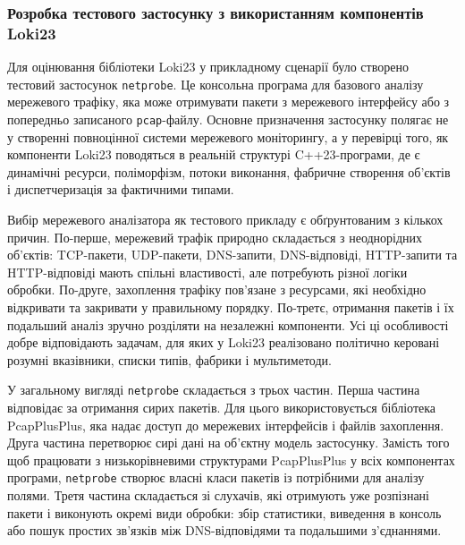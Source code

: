 \subsubsection{Розробка тестового застосунку з використанням компонентів
Loki23}\label{ux440ux43eux437ux440ux43eux431ux43aux430-ux442ux435ux441ux442ux43eux432ux43eux433ux43e-ux437ux430ux441ux442ux43eux441ux443ux43dux43aux443-ux437-ux432ux438ux43aux43eux440ux438ux441ux442ux430ux43dux43dux44fux43c-ux43aux43eux43cux43fux43eux43dux435ux43dux442ux456ux432-loki23}

Для оцінювання бібліотеки Loki23 у прикладному сценарії було створено
тестовий застосунок \texttt{netprobe}. Це консольна програма для
базового аналізу мережевого трафіку, яка може отримувати пакети з
мережевого інтерфейсу або з попередньо записаного \texttt{pcap}-файлу.
Основне призначення застосунку полягає не у створенні повноцінної
системи мережевого моніторингу, а у перевірці того, як компоненти Loki23
поводяться в реальній структурі C++23-програми, де є динамічні ресурси,
поліморфізм, потоки виконання, фабричне створення об'єктів і
диспетчеризація за фактичними типами.

Вибір мережевого аналізатора як тестового прикладу є обґрунтованим з
кількох причин. По-перше, мережевий трафік природно складається з
неоднорідних об'єктів: TCP-пакети, UDP-пакети, DNS-запити,
DNS-відповіді, HTTP-запити та HTTP-відповіді мають спільні властивості,
але потребують різної логіки обробки. По-друге, захоплення трафіку
пов'язане з ресурсами, які необхідно відкривати та закривати у
правильному порядку. По-третє, отримання пакетів і їх подальший аналіз
зручно розділяти на незалежні компоненти. Усі ці особливості добре
відповідають задачам, для яких у Loki23 реалізовано політично керовані
розумні вказівники, списки типів, фабрики і мультиметоди.

У загальному вигляді \texttt{netprobe} складається з трьох частин. Перша
частина відповідає за отримання сирих пакетів. Для цього
використовується бібліотека PcapPlusPlus, яка надає доступ до мережевих
інтерфейсів і файлів захоплення. Друга частина перетворює сирі дані на
об'єктну модель застосунку. Замість того щоб працювати з низькорівневими
структурами PcapPlusPlus у всіх компонентах програми, \texttt{netprobe}
створює власні класи пакетів із потрібними для аналізу полями. Третя
частина складається зі слухачів, які отримують уже розпізнані пакети і
виконують окремі види обробки: збір статистики, виведення в консоль або
пошук простих зв'язків між DNS-відповідями та подальшими з'єднаннями.

